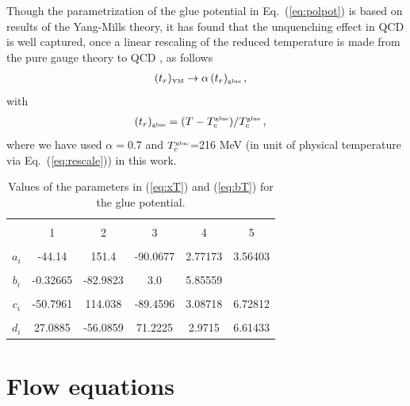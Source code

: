 \documentclass[%
reprint,
superscriptaddress,
showpacs,preprintnumbers,
 amsmath,amssymb,
 aps,
prd,
]{revtex4-1}
\def\Eq#1{Eq.~(\ref{#1})}
\def\eq#1{(\ref{#1})}
\begin{document}
Though the parametrization of the glue potential in \Eq{eq:polpot} is based on results of the Yang-Mills theory, it has found that the unquenching effect in QCD is well captured, once a linear rescaling of the reduced temperature is made from the pure gauge theory to QCD \cite{Pawlowski:2010ht, Haas:2013qwp, Herbst:2013ufa}, as follows
%
\begin{align}
  (t_r)_{\text{\tiny{YM}}}&\rightarrow \alpha\,(t_r)_{\text{\tiny{glue}}}\,,\label{}
\end{align}
%
with
%
\begin{align}
  (t_r)_{\text{\tiny{glue}}}&=
    (T-T_c^\text{\tiny{glue}})/T_c^\text{\tiny{glue}}\,,\label{}
\end{align}
%
where we have used $\alpha=0.7$ and $T_c^\text{\tiny{glue}}$=216 MeV (in unit of physical temperature via \Eq{eq:rescale}) in this work.


%
\begin{table}[tb!]
  \begin{center}
    \begin{tabular}{|c||c|c|c|c|c|}
    \hline & & & & &  \\[-2ex]
    \hline & & & & & \\[-1ex]
     & 1 & 2 & 3 & 4 & 5 \\[1ex]
    \hline & & & & &  \\[-2ex]
    $a_i$ &-44.14& 151.4 & -90.0677 &2.77173 &3.56403 \\[1ex]
    \hline & & & & &  \\[-2ex]
    $b_i$ &-0.32665 &-82.9823 &3.0 &5.85559  &              \\[1ex]
    \hline & & & & &  \\[-2ex]
    $c_i$ &-50.7961 &114.038 &-89.4596 &3.08718 &6.72812 \\[1ex]
    \hline & & & & &  \\[-2ex]
    $d_i$ & 27.0885 &-56.0859 &71.2225 &2.9715 &6.61433 \\[1ex]
    \hline
    \end{tabular}
    \caption{Values of the parameters in \eq{eq:xT} and \eq{eq:bT} for the glue potential.}
    \label{tab:gluepotCoeffs}
  \end{center}\vspace{-0.5cm}
\end{table}
%

\section{Flow equations}
\label{app:flowV}
\end{document}
